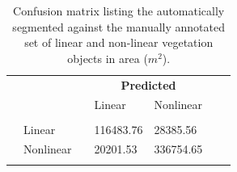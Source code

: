 \begin{table}
	\caption{Confusion matrix listing the automatically segmented against the manually annotated set of linear and non-linear vegetation objects in area (\(m^{2}\)).}
	\label{tab:confmatseg}
	\begin{tabular}{l l l l l l l}
		\toprule
		& & & \multicolumn{2}{c}{\textbf{Predicted}} & & \\
		& & & Linear & Nonlinear & & \\
		\midrule
		\parbox[t]{2mm}{} & & & & & & \\
		& Linear & & 116483.76 & 28385.56 & & \\
		& Nonlinear & & 20201.53 & 336754.65 & & \\
		& & & & & & \\
		\bottomrule
	\end{tabular}
\end{table}